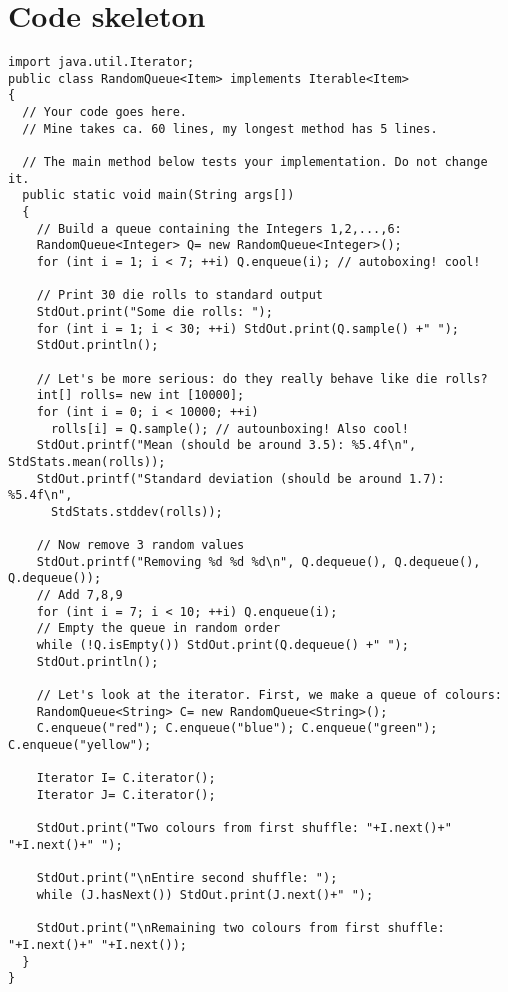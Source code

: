 \documentclass{tufte-handout}
\begin{document}
\section{Code skeleton}
\small
\begin{verbatim}
import java.util.Iterator;
public class RandomQueue<Item> implements Iterable<Item>
{
  // Your code goes here. 
  // Mine takes ca. 60 lines, my longest method has 5 lines.

  // The main method below tests your implementation. Do not change it.
  public static void main(String args[])
  {
    // Build a queue containing the Integers 1,2,...,6:
    RandomQueue<Integer> Q= new RandomQueue<Integer>();
    for (int i = 1; i < 7; ++i) Q.enqueue(i); // autoboxing! cool!
 
    // Print 30 die rolls to standard output
    StdOut.print("Some die rolls: ");
    for (int i = 1; i < 30; ++i) StdOut.print(Q.sample() +" ");
    StdOut.println();

    // Let's be more serious: do they really behave like die rolls?
    int[] rolls= new int [10000];
    for (int i = 0; i < 10000; ++i)
      rolls[i] = Q.sample(); // autounboxing! Also cool!
    StdOut.printf("Mean (should be around 3.5): %5.4f\n", StdStats.mean(rolls));
    StdOut.printf("Standard deviation (should be around 1.7): %5.4f\n",
      StdStats.stddev(rolls));
    
    // Now remove 3 random values
    StdOut.printf("Removing %d %d %d\n", Q.dequeue(), Q.dequeue(), Q.dequeue());
    // Add 7,8,9
    for (int i = 7; i < 10; ++i) Q.enqueue(i); 
    // Empty the queue in random order
    while (!Q.isEmpty()) StdOut.print(Q.dequeue() +" ");
    StdOut.println();

    // Let's look at the iterator. First, we make a queue of colours:
    RandomQueue<String> C= new RandomQueue<String>();
    C.enqueue("red"); C.enqueue("blue"); C.enqueue("green"); C.enqueue("yellow"); 

    Iterator I= C.iterator();
    Iterator J= C.iterator();

    StdOut.print("Two colours from first shuffle: "+I.next()+" "+I.next()+" ");
    
    StdOut.print("\nEntire second shuffle: ");
    while (J.hasNext()) StdOut.print(J.next()+" ");

    StdOut.print("\nRemaining two colours from first shuffle: "+I.next()+" "+I.next());
  }
}
\end{verbatim}
\end{document}
